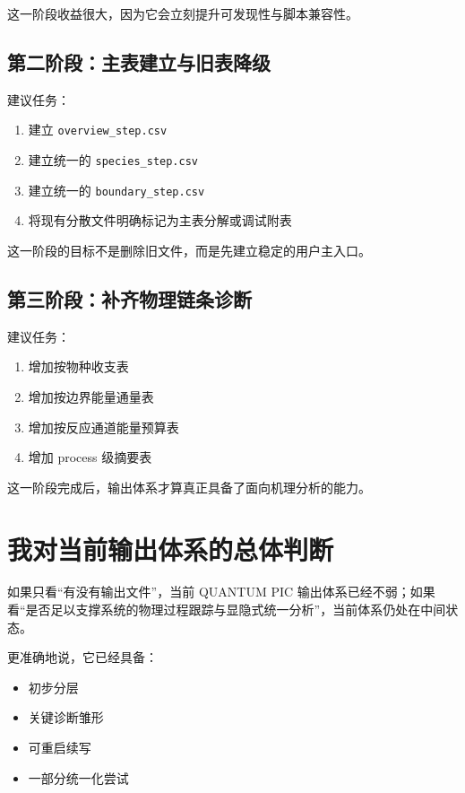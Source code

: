 \documentclass[11pt,a4paper]{ctexart}
\newcommand{\file}[1]{\texttt{#1}}
\begin{document}
这一阶段收益很大，因为它会立刻提升可发现性与脚本兼容性。

\subsection{第二阶段：主表建立与旧表降级}

建议任务：

\begin{enumerate}
  \item 建立 \file{overview\_step.csv}
  \item 建立统一的 \file{species\_step.csv}
  \item 建立统一的 \file{boundary\_step.csv}
  \item 将现有分散文件明确标记为主表分解或调试附表
\end{enumerate}

这一阶段的目标不是删除旧文件，而是先建立稳定的用户主入口。

\subsection{第三阶段：补齐物理链条诊断}

建议任务：

\begin{enumerate}
  \item 增加按物种收支表
  \item 增加按边界能量通量表
  \item 增加按反应通道能量预算表
  \item 增加 process 级摘要表
\end{enumerate}

这一阶段完成后，输出体系才算真正具备了面向机理分析的能力。

\section{我对当前输出体系的总体判断}

如果只看“有没有输出文件”，当前 QUANTUM PIC 输出体系已经不弱；如果看“是否足以支撑系统的物理过程跟踪与显隐式统一分析”，当前体系仍处在中间状态。

更准确地说，它已经具备：

\begin{itemize}
  \item 初步分层
  \item 关键诊断雏形
  \item 可重启续写
  \item 一部分统一化尝试
\end{itemize}
\end{document}
